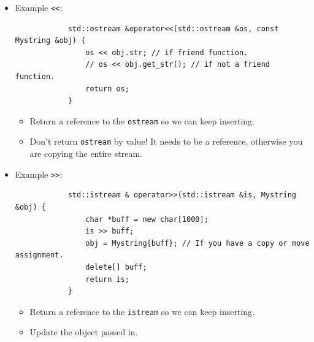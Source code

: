 \begin{itemize}
    \item Example \texttt{<<}:
        \begin{verbatim}
            std::ostream &operator<<(std::ostream &os, const Mystring &obj) {
                os << obj.str; // if friend function.
                // os << obj.get_str(); // if not a friend function.
                return os;
            }
        \end{verbatim}
        \begin{itemize}
            \item Return a reference to the \texttt{ostream} so we can keep inserting.
            \item Don't return \texttt{ostream} by value! It needs to be a reference, otherwise you are copying the entire stream.
        \end{itemize}
    
    \item Example \texttt{>>}:
        \begin{verbatim}
            std::istream & operator>>(std::istream &is, Mystring &obj) {
                char *buff = new char[1000];
                is >> buff;
                obj = Mystring{buff}; // If you have a copy or move assignment.
                delete[] buff;
                return is;
            }
        \end{verbatim}
        \begin{itemize}
            \item Return a reference to the \texttt{istream} so we can keep inserting.
            \item Update the object passed in.
        \end{itemize}
\end{itemize}

